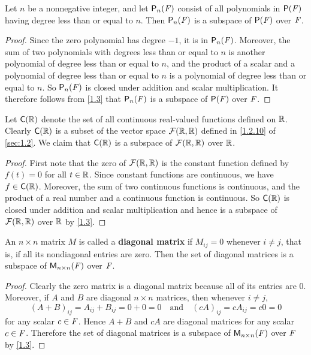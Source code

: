 \begin{eg}\label{1.3.6}
  Let \(n\) be a nonnegative integer, and let \(\ps[n]{\F}\) consist of all polynomials in \(\ps{\F}\) having degree less than or equal to \(n\).
  Then \(\ps[n]{\F}\) is a subspace of \(\ps{\F}\) over \(\mathit{F}\).
\end{eg}

\begin{proof}
  Since the zero polynomial has degree \(-1\), it is in \(\ps[n]{\F}\).
  Moreover, the sum of two polynomials with degrees less than or equal to \(n\) is another polynomial of degree less than or equal to \(n\), and the product of a scalar and a polynomial of degree less than or equal to \(n\) is a polynomial of degree less than or equal to \(n\).
  So \(\ps[n]{\F}\) is closed under addition and scalar multiplication.
  It therefore follows from \cref{1.3} that \(\ps[n]{\F}\) is a subspace of \(\ps{\F}\) over \(\mathit{F}\).
\end{proof}

\begin{eg}\label{1.3.7}
  Let \(\cfs{\R}\) denote the set of all continuous real-valued functions defined on \(\mathbb{R}\).
  Clearly \(\cfs{\R}\) is a subset of the vector space \(\fs{\R}{\R}\) defined in \cref{1.2.10} of \cref{sec:1.2}.
  We claim that \(\cfs{\R}\) is a subspace of \(\fs{\R}{\R}\) over \(\mathbb{R}\).
\end{eg}

\begin{proof}
  First note that the zero of \(\fs{\R}{\R}\) is the constant function defined by \(f(t) = 0\) for all \(t \in \mathbb{R}\).
  Since constant functions are continuous, we have \(f \in \cfs{\R}\).
  Moreover, the sum of two continuous functions is continuous, and the product of a real number and a continuous function is continuous.
  So \(\cfs{\R}\) is closed under addition and scalar multiplication and hence is a subspace of \(\fs{\R}{\R}\) over \(\mathbb{R}\) by \cref{1.3}.
\end{proof}

\begin{eg}\label{1.3.8}
  An \(n \times n\) matrix \(M\) is called a \textbf{diagonal matrix} if \(M_{i j} = 0\) whenever \(i \neq j\), that is, if all its nondiagonal entries are zero.
  Then the set of diagonal matrices is a subspace of \(\mathsf{M}_{{n} \times n}({\mathit{F}})\) over \(\mathit{F}\).
\end{eg}

\begin{proof}
  Clearly the zero matrix is a diagonal matrix because all of its entries are \(0\).
  Moreover, if \(A\) and \(B\) are diagonal \(n \times n\) matrices, then whenever \(i \neq j\),
  \[
    (A + B)_{i j} = A_{i j} + B_{i j} = 0 + 0 = 0 \quad \text{and} \quad (cA)_{i j} = cA_{i j} = c0 = 0
  \]
  for any scalar \(c \in \mathit{F}\).
  Hence \(A + B\) and \(cA\) are diagonal matrices for any scalar \(c \in \mathit{F}\).
  Therefore the set of diagonal matrices is a subspace of \(\mathsf{M}_{{n} \times n}({\mathit{F}})\) over \(\mathit{F}\) by \cref{1.3}.
\end{proof}

